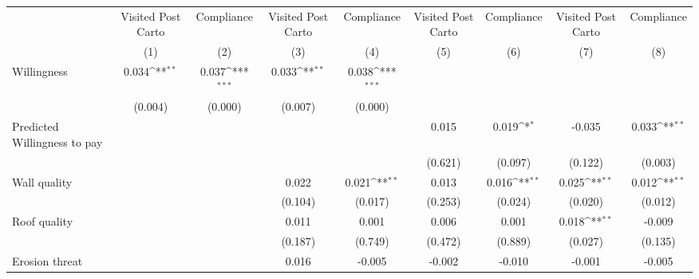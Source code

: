 {
\def\sym#1{\ifmmode^{#1}\else\(^{#1}\)\fi}
\begin{tabular}{l*{8}{c}}
\toprule
                &\multicolumn{1}{c}{Visited Post Carto}&\multicolumn{1}{c}{Compliance}&\multicolumn{1}{c}{Visited Post Carto}&\multicolumn{1}{c}{Compliance}&\multicolumn{1}{c}{Visited Post Carto}&\multicolumn{1}{c}{Compliance}&\multicolumn{1}{c}{Visited Post Carto}&\multicolumn{1}{c}{Compliance}\\
                &\multicolumn{1}{c}{(1)}         &\multicolumn{1}{c}{(2)}         &\multicolumn{1}{c}{(3)}         &\multicolumn{1}{c}{(4)}         &\multicolumn{1}{c}{(5)}         &\multicolumn{1}{c}{(6)}         &\multicolumn{1}{c}{(7)}         &\multicolumn{1}{c}{(8)}         \\
\midrule
Willingness     &    0.034\sym{**} &    0.037\sym{***}&    0.033\sym{**} &    0.038\sym{***}&                  &                  &                  &                  \\
                &  (0.004)         &  (0.000)         &  (0.007)         &  (0.000)         &                  &                  &                  &                  \\
Predicted Willingness to pay&                  &                  &                  &                  &    0.015         &    0.019\sym{*}  &   -0.035         &    0.033\sym{**} \\
                &                  &                  &                  &                  &  (0.621)         &  (0.097)         &  (0.122)         &  (0.003)         \\
Wall quality    &                  &                  &    0.022         &    0.021\sym{**} &    0.013         &    0.016\sym{**} &    0.025\sym{**} &    0.012\sym{**} \\
                &                  &                  &  (0.104)         &  (0.017)         &  (0.253)         &  (0.024)         &  (0.020)         &  (0.012)         \\
Roof quality    &                  &                  &    0.011         &    0.001         &    0.006         &    0.001         &    0.018\sym{**} &   -0.009         \\
                &                  &                  &  (0.187)         &  (0.749)         &  (0.472)         &  (0.889)         &  (0.027)         &  (0.135)         \\
Erosion threat  &                  &                  &    0.016         &   -0.005         &   -0.002         &   -0.010         &   -0.001         &   -0.005         \\

\end{tabular}}
